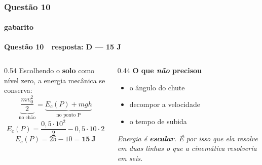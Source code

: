 \documentclass[aspectratio=169,12pt]{beamer}
\newcommand{\resposta}[2]{%
  \par\vspace{0.2em}
  {\Large\bfseries\color{vinho}Quest\~ao #1 \,\textemdash\, resposta: #2}
  \par\vspace{0.6em}}
\begin{document}
\begin{frame}
\frametitle{Quest\~ao 10}
\framesubtitle{gabarito}
\resposta{10}{D --- 15 J}

\begin{columns}[T]
\begin{column}{0.54\textwidth}
Escolhendo o \textbf{solo} como n\'ivel zero, a energia mec\^anica se
conserva:
\[ \underbrace{\frac{m v_0^{2}}{2}}_{\text{no ch\~ao}}
   = \underbrace{E_c(P) + m g h}_{\text{no ponto P}} \]
\[ E_c(P) = \frac{0{,}5\cdot 10^{2}}{2} - 0{,}5\cdot 10\cdot 2 \]
\[ E_c(P) = 25 - 10 = \mathbf{15\ J} \]
\end{column}
\begin{column}{0.44\textwidth}
\textbf{O que \textit{n\~ao} precisou}\\
\begin{itemize}
  \item o \^angulo do chute
  \item decompor a velocidade
  \item o tempo de subida
\end{itemize}

\vspace{0.4em}
{\color{grafite}\itshape Energia \'e \textbf{escalar}. \'E por isso
que ela resolve em duas linhas o que a cinem\'atica resolveria em
seis.}
\end{column}
\end{columns}
\end{frame}
\end{document}
